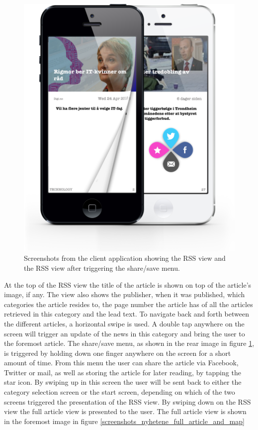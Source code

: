 \begin{figure}[!htbp]
\centering
\includegraphics[width=120mm]{GFX/clientApp/rssViewAndShare.png}
\caption{Screenshots from the client application showing the RSS view and the RSS view after triggering the share/save menu.}
\label{screenshots_nyhetene_rss_and_share}
\end{figure}

At the top of the RSS view the title of the article is shown on top of the article's image, if any. The view also shows the publisher, when it was published, which categories the article resides to, the page number the article has of all the articles retrieved in this category and the lead text. To navigate back and forth between the different articles, a horizontal swipe is used. A double tap anywhere on the screen will trigger an update of the news in this category and bring the user to the foremost article. The share/save menu, as shown in the rear image in figure \ref{screenshots_nyhetene_rss_and_share}, is triggered by holding down one finger anywhere on the screen for a short amount of time. From this menu the user can share the article via Facebook, Twitter or mail, as well as storing the article for later reading, by tapping the star icon. By swiping up in this screen the user will be sent back to either the category selection screen or the start screen, depending on which of the two screens triggered the presentation of the RSS view. By swiping down on the RSS view the full article view is presented to the user. The full article view is shown in the foremost image in figure \ref{screenshots_nyhetene_full_article_and_map}


